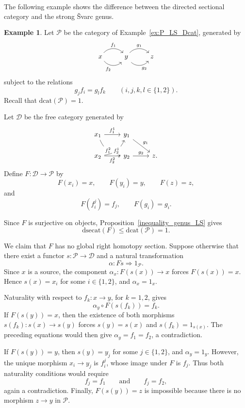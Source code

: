 \documentclass[12pt]{amsart}
\theoremstyle{definition}
\newtheorem{example}[teo]{Example}
\theoremstyle{remark}
\numberwithin{figure}{section}%
\newcommand{\Dc}{\mathcal{D}}
\begin{document}
The following example shows the difference between the directed sectional category and the strong \v{S}varc genus.

\begin{example}\label{ex:Sg_dsecat_gap}
Let \(\mathcal P\) be the category of
Example~\ref{ex:P_LS_Dcat}, generated by
\[
\begin{tikzcd}
x
  \arrow[r, "f_1", bend left=49]
  \arrow[r, "f_2"', bend right=49]
&
y
  \arrow[r, "g_1", bend left=49]
  \arrow[r, "g_2"', bend right=49]
&
z
\end{tikzcd}
\]
subject to the relations
\[
g_jf_i=g_lf_k
\qquad
(i,j,k,l\in\{1,2\}).
\]
Recall that \(\mathrm{dcat}(\mathcal P)=1\).

Let \(\Dc\) be the free category generated by
\[
\begin{tikzcd}
x_1
  \arrow[r, "f_1^1"]
  \arrow[rd, "f_1^2" description, bend right=30]
&
y_1 \arrow[rd, "g_1"]
&
\\
x_2
  \arrow[r, "f_2^2"']
  \arrow[ru, "f_2^1" description, bend right=30]
&
y_2 \arrow[r, "g_2"]
&
z .
\end{tikzcd}
\]
Define \(F\colon\Dc\to\mathcal P\) by
\[
F(x_i)=x,\qquad F(y_i)=y,\qquad F(z)=z,
\]
and
\[
F(f_i^j)=f_j,\qquad F(g_i)=g_i.
\]

Since \(F\) is surjective on objects,
Proposition~\ref{inequality_genus_LS} gives
\[
\mathrm{dsecat}(F)
\leq
\mathrm{dcat}(\mathcal P)
=
1.
\]

We claim that \(F\) has no global right homotopy section. Suppose otherwise
that there exist a functor \(s\colon\mathcal P\to\Dc\) and a natural
transformation
\[
\alpha\colon Fs\Rightarrow1_{\mathcal P}.
\]
Since \(x\) is a source, the component
\(\alpha_x\colon F(s(x))\to x\) forces
\(F(s(x))=x\). Hence \(s(x)=x_i\) for some \(i\in\{1,2\}\), and
\(\alpha_x=1_x\).

Naturality with respect to \(f_k\colon x\to y\), for \(k=1,2\), gives
\[
\alpha_y\circ F(s(f_k))=f_k.
\]
If \(F(s(y))=x\), then the existence of both morphisms
\(s(f_k)\colon s(x)\to s(y)\) forces \(s(y)=s(x)\) and
\(s(f_k)=1_{s(x)}\). The preceding equations would then give
\(\alpha_y=f_1=f_2\), a contradiction.

If \(F(s(y))=y\), then \(s(y)=y_j\) for some \(j\in\{1,2\}\), and
\(\alpha_y=1_y\). However, the unique morphism \(x_i\to y_j\) is
\(f_i^j\), whose image under \(F\) is \(f_j\). Thus both naturality
conditions would require
\[
f_j=f_1
\qquad\text{and}\qquad
f_j=f_2,
\]
again a contradiction. Finally, \(F(s(y))=z\) is impossible because there
is no morphism \(z\to y\) in \(\mathcal P\).


\end{example}
\end{document}
